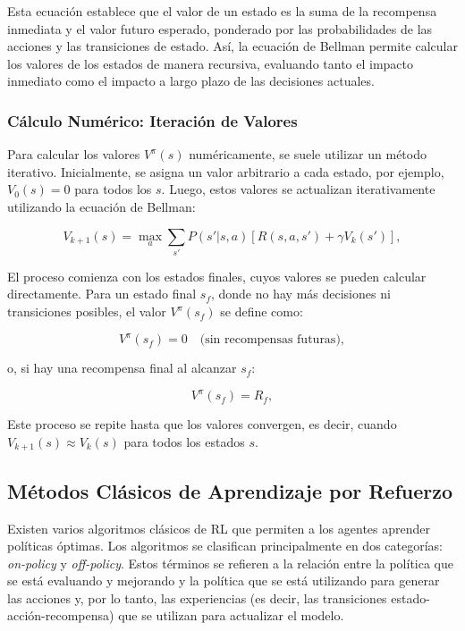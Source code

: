\documentclass[a4paper,12pt, twoside]{report}
\begin{document}
Esta ecuación establece que el valor de un estado es la suma de la recompensa inmediata 
y el valor futuro esperado, ponderado por las probabilidades de las acciones y las 
transiciones de estado. Así, la ecuación de Bellman permite calcular los valores de 
los estados de manera recursiva, evaluando tanto el impacto inmediato como el impacto a 
largo plazo de las decisiones actuales.

\subsubsection{Cálculo Numérico: Iteración de Valores}

Para calcular los valores \(V^\pi(s)\) numéricamente, se suele utilizar un método iterativo. 
Inicialmente, se asigna un valor arbitrario a cada estado, por ejemplo, \(V_0(s) = 0\) para 
todos los \(s\). Luego, estos valores se actualizan iterativamente utilizando la ecuación de 
Bellman:

\begin{equation}
V_{k+1}(s) = \max_{a} \sum_{s'} P(s'|s,a) \left[ R(s,a,s') + \gamma V_k(s') \right],
\end{equation}

El proceso comienza con los estados finales, cuyos valores se pueden calcular directamente. 
Para un estado final \(s_f\), donde no hay más decisiones ni transiciones posibles, el 
valor \(V^\pi(s_f)\) se define como:

\begin{equation}
V^\pi(s_f) = 0 \quad \text{(sin recompensas futuras)},
\end{equation}

o, si hay una recompensa final al alcanzar \(s_f\):

\begin{equation}
V^\pi(s_f) = R_f,
\end{equation}

Este proceso se repite hasta que los valores convergen, es decir, cuando \(V_{k+1}(s) 
\approx V_k(s)\) para todos los estados \(s\).


\subsection{Métodos Clásicos de Aprendizaje por Refuerzo}

Existen varios algoritmos clásicos de RL que permiten a los agentes aprender políticas óptimas. Los 
algoritmos se clasifican principalmente en dos categorías: \textit{on-policy} y \textit{off-policy}. 
Estos términos se refieren a la relación entre la política que se está evaluando y mejorando y la 
política que se está utilizando para generar las acciones y, por lo tanto, las experiencias (es decir, 
las transiciones estado-acción-recompensa) que se utilizan para actualizar el modelo.
\end{document}
